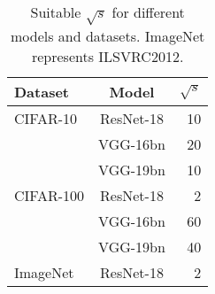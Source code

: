 \begin{table}[tb]
	\caption{Suitable $\sqrt{s}$ for different models and datasets. ImageNet represents ILSVRC2012.
	}
	\label{table:goods}
	\vskip 0.15in
	\begin{center}
		\begin{small}
				\begin{tabular}{lcr}
					\hline
					Dataset & Model & $\sqrt{s}$ \\
					\hline
					CIFAR-10 & ResNet-18 & 10  \\
					& VGG-16bn & 20 \\
					& VGG-19bn & 10 \\
					CIFAR-100& ResNet-18 & 2  \\
					& VGG-16bn & 60 \\
					& VGG-19bn & 40 \\
					ImageNet & ResNet-18 & 2 \\
					\hline
				\end{tabular}
		\end{small}
	\end{center}		
\end{table}
